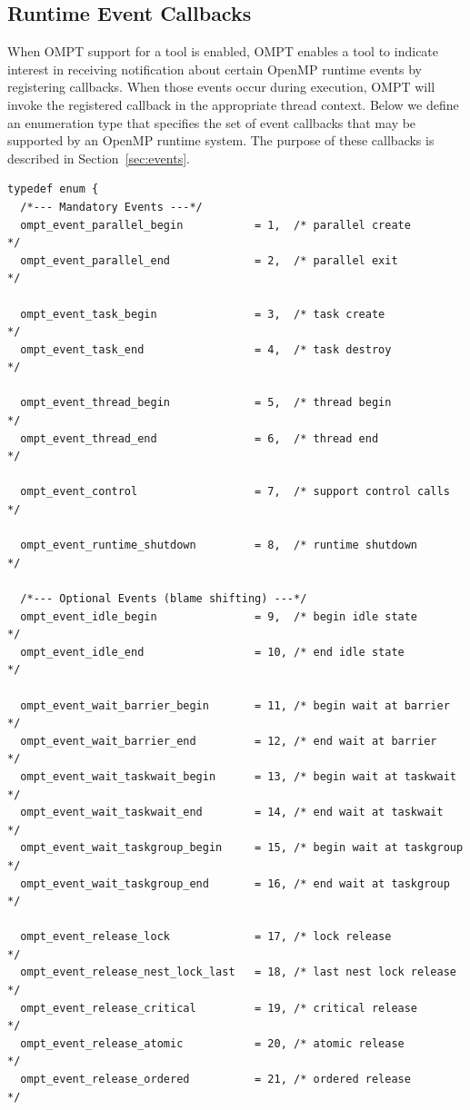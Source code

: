 \documentclass{article}
\begin{document}
{\subsection{Runtime Event Callbacks}
\label{appendix:ompt-types:events}

When OMPT support for a tool is enabled, 
OMPT enables a tool to indicate interest in receiving notification about certain OpenMP runtime events by registering callbacks. When those events occur during execution, OMPT will invoke the registered callback in the appropriate thread context.
Below we define an enumeration type that specifies the set of event callbacks that may be supported by an OpenMP runtime system. 
The purpose of these callbacks is described in Section~\ref{sec:events}. 

\begin{verbatim}
typedef enum {  
  /*--- Mandatory Events ---*/          
  ompt_event_parallel_begin           = 1,  /* parallel create            */
  ompt_event_parallel_end             = 2,  /* parallel exit              */

  ompt_event_task_begin               = 3,  /* task create                */
  ompt_event_task_end                 = 4,  /* task destroy               */

  ompt_event_thread_begin             = 5,  /* thread begin               */
  ompt_event_thread_end               = 6,  /* thread end                 */

  ompt_event_control                  = 7,  /* support control calls      */

  ompt_event_runtime_shutdown         = 8,  /* runtime shutdown           */

  /*--- Optional Events (blame shifting) ---*/  		    
  ompt_event_idle_begin	              = 9,  /* begin idle state           */ 
  ompt_event_idle_end                 = 10, /* end idle state             */ 

  ompt_event_wait_barrier_begin       = 11, /* begin wait at barrier      */
  ompt_event_wait_barrier_end         = 12, /* end wait at barrier        */
  ompt_event_wait_taskwait_begin      = 13, /* begin wait at taskwait     */
  ompt_event_wait_taskwait_end        = 14, /* end wait at taskwait       */
  ompt_event_wait_taskgroup_begin     = 15, /* begin wait at taskgroup    */
  ompt_event_wait_taskgroup_end       = 16, /* end wait at taskgroup      */

  ompt_event_release_lock             = 17, /* lock release               */
  ompt_event_release_nest_lock_last   = 18, /* last nest lock release     */
  ompt_event_release_critical         = 19, /* critical release           */
  ompt_event_release_atomic           = 20, /* atomic release             */
  ompt_event_release_ordered          = 21, /* ordered release            */


\end{verbatim}}
\end{document}
